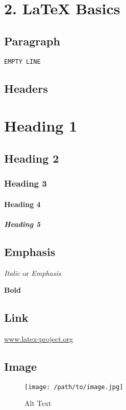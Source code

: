 \section{2. LaTeX Basics}

\subsection{Paragraph}

\texttt{EMPTY\ LINE}

\subsection{Headers}

\section{Heading 1}

\subsection{Heading 2}

\subsubsection{Heading 3}

\paragraph{Heading 4}

\subparagraph{Heading 5}

\subsection{Emphasis}

\textit{Italic} or \emph{Emphasis}

\textbf{Bold}

\subsection{Link}

\href{https://www.latex-project.org}{www.latex-project.org}

\subsection{Image}

\begin{figure}[htbp]
\centering
\texttt{[image: /path/to/image.jpg]}
\caption{Alt Text}
\end{figure}

